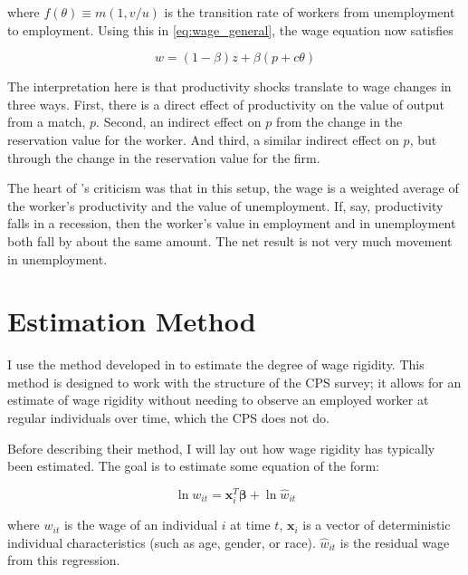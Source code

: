 \documentclass[11pt]{article}
\begin{document}
where $f(\theta) \equiv m(1, v/u)$ is the transition rate of workers from unemployment to employment.
Using this in \autoref{eq:wage_general}, the wage equation now satisfies

\begin{equation}
    w = (1 - \beta) z + \beta ( p + c \theta )
\end{equation}

The interpretation here is that productivity shocks translate to wage changes in three ways.
First, there is a direct effect of productivity on the value of output from a match, $p$.
Second, an indirect effect on $p$ from the change in the reservation value for the worker.
And third, a similar indirect effect on $p$, but through the change in the reservation value for the firm.

The heart of \cite{shimer_2005}'s criticism was that in this setup, the wage is a weighted average of the worker's productivity and the value of unemployment.
If, say, productivity falls in a recession, then the worker's value in employment and in unemployment both fall by about the same amount.
The net result is not very much movement in unemployment.


\section{Estimation Method}
\label{sec:statistical_method}

I use the method developed in \cite{haefke_sonntag_vanRens_2013} to estimate the degree of wage rigidity.
This method is designed to work with the structure of the CPS survey;
it allows for an estimate of wage rigidity without needing to observe an employed worker at regular individuals over time, which the CPS does not do.

Before describing their method, I will lay out how wage rigidity has typically been estimated.
The goal is to estimate some equation of the form:

\begin{equation}
    \label{eq:individual_wage}
    \ln w_{it} = \boldsymbol{x}_i^{T} \boldsymbol{\beta} + \ln \hat{w}_{it}
\end{equation}

where $w_{it}$ is the wage of an individual $i$ at time $t$, $\boldsymbol{x}_i$ is a vector of deterministic individual characteristics (such as age, gender, or race). $\hat{w}_{it}$ is the residual wage from this regression.
\end{document}
